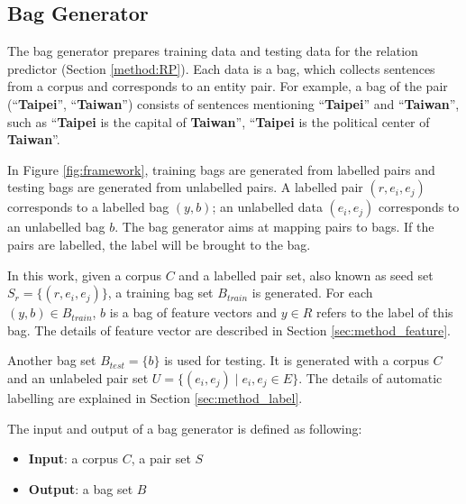 \subsection{Bag Generator}

The bag generator prepares training data and testing data for the relation predictor (Section \ref{method:RP}).
Each data is a bag, which collects sentences from a corpus and corresponds to an entity pair.
For example, a bag of the pair (``\textbf{Taipei}'', ``\textbf{Taiwan}'') consists of sentences mentioning ``\textbf{Taipei}'' and ``\textbf{Taiwan}'', such as ``\textbf{Taipei} is the capital of \textbf{Taiwan}'', ``\textbf{Taipei} is the political center of \textbf{Taiwan}''.
\par
In Figure \ref{fig:framework}, training bags are generated from labelled pairs and testing bags are generated from unlabelled pairs.
A labelled pair $(r, e_i, e_j)$ corresponds to a labelled bag $(y,b)$; an unlabelled data $(e_i,e_j)$ corresponds to an unlabelled bag $b$.
The bag generator aims at mapping pairs to bags.
If the pairs are labelled, the label will be brought to the bag.
\par
In this work, given a corpus $C$ and a labelled pair set, also known as seed set $S_r=\{(r,e_i,e_j)\}$, a training bag set $B_{train}$ is generated.
For each $(y,b)\in B_{train}$, $b$ is a bag of feature vectors and $y\in R$ refers to the label of this bag.
The details of feature vector are described in Section \ref{sec:method_feature}.
\par
Another bag set $B_{test}=\{b\}$ is used for testing.
It is generated with a corpus $C$ and an unlabeled pair set $U=\{(e_i,e_j) \mid e_i,e_j\in E\}$.
The details of automatic labelling are explained in Section \ref{sec:method_label}.
\par
The input and output of a bag generator is defined as following:
\begin{itemize}
\item \textbf{Input}: a corpus $C$, a pair set $S$
\item \textbf{Output}: a bag set $B$
\end{itemize}

